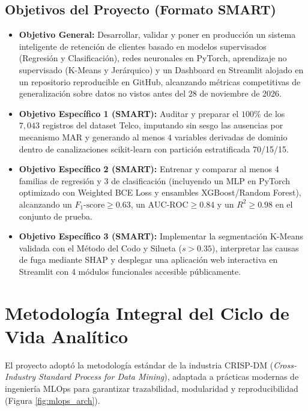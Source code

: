 \documentclass[11pt,letterpaper]{article}
\begin{document}
\subsection{Objetivos del Proyecto (Formato SMART)}
\begin{itemize}
    \item \textbf{Objetivo General:} Desarrollar, validar y poner en producción un sistema inteligente de retención de clientes basado en modelos supervisados (Regresión y Clasificación), redes neuronales en PyTorch, aprendizaje no supervisado (K-Means y Jerárquico) y un Dashboard en Streamlit alojado en un repositorio reproducible en GitHub, alcanzando métricas competitivas de generalización sobre datos no vistos antes del 28 de noviembre de 2026.
    \item \textbf{Objetivo Específico 1 (SMART):} Auditar y preparar el $100\%$ de los $7{,}043$ registros del dataset Telco, imputando sin sesgo las ausencias por mecanismo MAR y generando al menos $4$ variables derivadas de dominio dentro de canalizaciones scikit-learn con partición estratificada 70/15/15.
    \item \textbf{Objetivo Específico 2 (SMART):} Entrenar y comparar al menos 4 familias de regresión y 3 de clasificación (incluyendo un MLP en PyTorch optimizado con Weighted BCE Loss y ensambles XGBoost/Random Forest), alcanzando un $F_1\text{-score} \ge 0.63$, un $\text{AUC-ROC} \ge 0.84$ y un $R^2 \ge 0.98$ en el conjunto de prueba.
    \item \textbf{Objetivo Específico 3 (SMART):} Implementar la segmentación K-Means validada con el Método del Codo y Silueta ($s > 0.35$), interpretar las causas de fuga mediante SHAP y desplegar una aplicación web interactiva en Streamlit con 4 módulos funcionales accesible públicamente.
\end{itemize}

\section{Metodología Integral del Ciclo de Vida Analítico}

El proyecto adoptó la metodología estándar de la industria CRISP-DM (\textit{Cross-Industry Standard Process for Data Mining}), adaptada a prácticas modernas de ingeniería MLOps para garantizar trazabilidad, modularidad y reproducibilidad (Figura \ref{fig:mlops_arch}).
\end{document}
